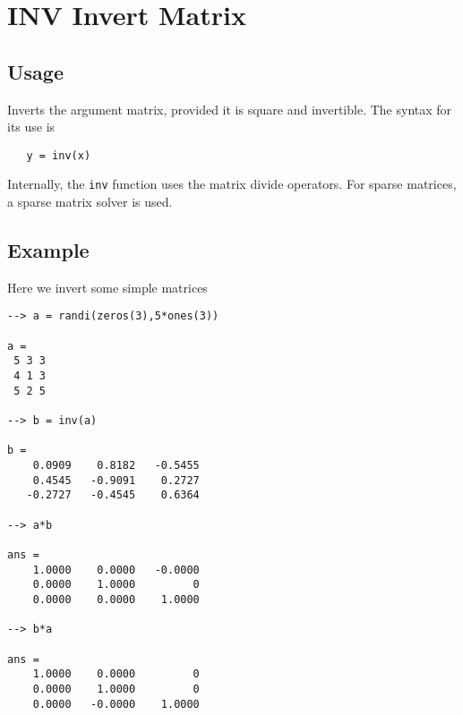 \section{INV Invert Matrix}

\subsection{Usage}

Inverts the argument matrix, provided it is square and invertible.
The syntax for its use is
\begin{verbatim}
   y = inv(x)
\end{verbatim}
Internally, the \verb|inv| function uses the matrix divide operators.
For sparse matrices, a sparse matrix solver is used.
\subsection{Example}

Here we invert some simple matrices
\begin{verbatim}
--> a = randi(zeros(3),5*ones(3))

a = 
 5 3 3 
 4 1 3 
 5 2 5 

--> b = inv(a)

b = 
    0.0909    0.8182   -0.5455 
    0.4545   -0.9091    0.2727 
   -0.2727   -0.4545    0.6364 

--> a*b

ans = 
    1.0000    0.0000   -0.0000 
    0.0000    1.0000         0 
    0.0000    0.0000    1.0000 

--> b*a

ans = 
    1.0000    0.0000         0 
    0.0000    1.0000         0 
    0.0000   -0.0000    1.0000 
\end{verbatim}
